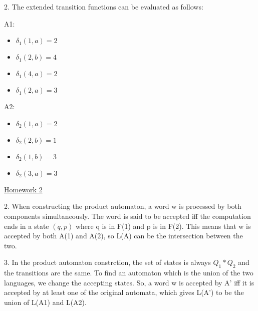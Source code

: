 \documentclass{article}
\theoremstyle{theorem}
\theoremstyle{definition}
\theoremstyle{remark}
\begin{document}
2. The extended transition functions can be evaluated as follows:

A1:
\begin{itemize}
  \item $\delta_1(1, a) = 2$
  \item $\delta_1(2, b) = 4$
  \item $\delta_1(4, a) = 2$
  \item $\delta_1(2, a) = 3$
\end{itemize}

A2:
\begin{itemize}
  \item $\delta_2(1, a) = 2$
  \item $\delta_2(2, b) = 1$
  \item $\delta_2(1, b) = 3$
  \item $\delta_2(3, a) = 3$
\end{itemize}

\underline{Homework 2}


2. When constructing the product automaton, a word w is processed by both components simultaneously. The word is said to be accepted iff the computation ends in a state $(q,p)$ where q is in F(1) and p is in F(2). This means that w is accepted by both A(1) and A(2), so L(A) can be the intersection between the two. 

3. In the product automaton constrction, the set of states is always $Q_1 * Q_2$ and the transitions are the same. To find an automaton which is the union of the two languages, we change the accepting states. So, a word w is accepted by A' iff it is accepted by at least one of the original automata, which gives L(A') to be the union of L(A1) and L(A2). 
\end{document}

